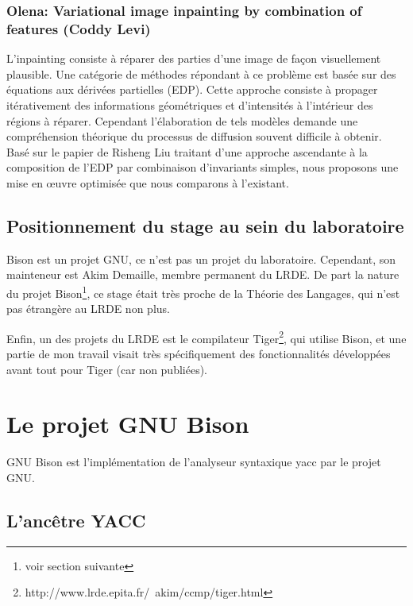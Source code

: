 \documentclass[a4paper,11pt,twoside,final]{article}
\begin{document}
  \subsubsection*{Olena: Variational image inpainting by combination of features
  (Coddy Levi)}

  L'inpainting consiste à réparer des parties d'une image de façon visuellement
  plausible. Une catégorie de méthodes répondant à ce problème est basée sur
  des équations aux dérivées partielles (EDP). Cette approche consiste à
  propager itérativement des informations géométriques et d'intensités à
  l'intérieur des régions à réparer. Cependant l'élaboration de tels modèles
  demande une compréhension théorique du processus de diffusion souvent
  difficile à obtenir. Basé sur le papier de Risheng Liu traitant d'une
  approche ascendante à la composition de l'EDP par combinaison d'invariants
  simples, nous proposons une mise en œuvre optimisée que nous comparons à
  l'existant.

  \subsection{Positionnement du stage au sein du laboratoire}

  Bison est un projet GNU, ce n'est pas un projet du laboratoire. Cependant,
  son mainteneur est Akim Demaille, membre permanent du LRDE\@. De part la
  nature du projet Bison\footnote{voir section suivante}, ce stage était très
  proche de la Théorie des Langages, qui n'est pas étrangère au LRDE non plus.

  Enfin, un des projets du LRDE est le compilateur Tiger\footnote{%
  http://www.lrde.epita.fr/~akim/ccmp/tiger.html}, qui utilise Bison, et
  une partie de mon travail visait très spécifiquement des fonctionnalités
  développées avant tout pour Tiger (car non publiées).

  \cleardoublepage

  \section{Le projet GNU Bison}

  GNU Bison est l'implémentation de l'analyseur syntaxique yacc par le projet
  GNU.

  \subsection{L'ancêtre YACC}
\end{document}
